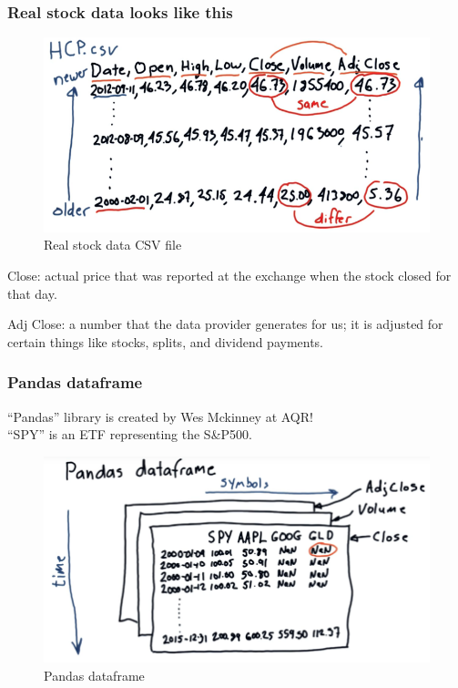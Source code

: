 \documentclass[12pt]{article}
\newcommand{\q}[1]{``#1''}
\begin{document}
\subsubsection{Real stock data looks like this}
\begin{figure}[!ht]
\centering
\includegraphics[scale=0.4]{fig/fig2}
\caption{Real stock data CSV file}
\end{figure}

Close: actual price that was reported at the exchange when the stock closed for that day.

Adj Close: a number that the data provider generates for us; it is adjusted for certain things like stocks, splits, and dividend payments.

\subsubsection{Pandas dataframe} 
\q{Pandas} library is created by Wes Mckinney at AQR!\\
\noindent
\q{SPY} is an ETF representing the S\&P500.
\begin{figure}[!ht]
\centering
\includegraphics[scale=0.45]{fig/fig3}
\caption{Pandas dataframe}
\end{figure}
\end{document}
